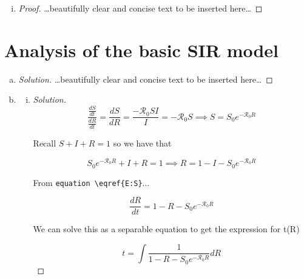 \documentclass[12pt]{article}
\begin{document}
\begin{enumerate}[(a)]
\begin{enumerate}[(i)]
  \item \SIanalQbii
    
    {\color{blue}
      \begin{proof}
        {\color{magenta}\dots beautifully clear and concise text to be inserted here\dots}
      \end{proof}
    }
    
  \end{enumerate}
\end{enumerate}

\section{Analysis of the basic SIR model}

\basicSIRanalIntro
\begin{enumerate}[(a)]
\item \basicSIRanalQa

{\color{blue}
\begin{proof}[Solution]
{\color{magenta}\dots beautifully clear and concise text to be inserted here\dots}
\end{proof}
}

\item \basicSIRanalQb
  \begin{enumerate}[(i)]
  \item \basicSIRanalQbi

{\color{blue}
\begin{proof}[Solution]

	\begin{equation}
	\frac{\frac{dS}{dt}}{\frac{dR}{dt}} = \frac{dS}{dR} = \frac{-\mathcal{R}_0SI}{I} = -\mathcal{R}_0S \implies S=S_0e^{-\mathcal{R}_0R}
	\end{equation}
	
	Recall $S+I+R=1$ so we have that
	
	\begin{equation}
	S_0e^{-\mathcal{R}_0R}+I+R = 1 \implies R=1-I-S_0e^{-\mathcal{R}_0R}
	\end{equation}
	
	From \verb|equation \eqref{E:S}|...
	
	\begin{equation}
	\frac{dR}{dt}=1-R-S_0e^{-\mathcal{R}_0R}
	\end{equation}
	
	We can solve this as a separable equation to  get the expression for t(R)
	
	\begin{equation}
	t=\int \frac{1}{1-R-S_0e^{-\mathcal{R}_0R}}dR
	\end{equation}
	

\end{proof}}
\end{enumerate}
\end{enumerate}
\end{document}
